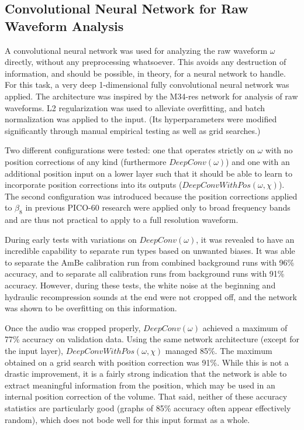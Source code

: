 \documentclass[10pt]{article}
\begin{document}
\subsection{Convolutional Neural Network for Raw Waveform Analysis}

A convolutional neural network was used for analyzing the raw waveform $\omega$ directly, without any preprocessing whatsoever. This avoids any destruction of information, and should be possible, in theory, for a neural network to handle. For this task, a very deep 1-dimensional fully convolutional neural network was applied. The architecture was inspired by the M34-res network \cite{verydeepconvnets} for analysis of raw waveforms. L2 regularization was used to alleviate overfitting, and batch normalization was applied to the input. (Its hyperparameters were modified significantly through manual empirical testing as well as grid searches.)

Two different configurations were tested: one that operates strictly on $\omega$ with no position corrections of any kind (furthermore $DeepConv(\omega)$) and one with an additional position input on a lower layer such that it should be able to learn to incorporate position corrections into its outputs ($DeepConvWithPos(\omega, \chi)$). The second configuration was introduced because the position corrections applied to $\beta_{8}$ in previous PICO-60 research were applied only to broad frequency bands and are thus not practical to apply to a full resolution waveform.

During early tests with variations on $DeepConv(\omega)$, it was revealed to have an incredible capability to separate run types based on unwanted biases. It was able to separate the AmBe calibration run from combined background runs with 96\% accuracy, and to separate all calibration runs from background runs with 91\% accuracy. However, during these tests, the white noise at the beginning and hydraulic recompression sounds at the end were not cropped off, and the network was shown to be overfitting on this information.

Once the audio was cropped properly, $DeepConv(\omega)$ achieved a maximum of 77\% accuracy on validation data. Using the same network architecture (except for the input layer), $DeepConvWithPos(\omega, \chi)$ managed 85\%. The maximum obtained on a grid search with position correction was 91\%. While this is not a drastic improvement, it is a fairly strong indication that the network is able to extract meaningful information from the position, which may be used in an internal position correction of the volume. That said, neither of these accuracy statistics are particularly good (graphs of 85\% accuracy often appear effectively random), which does not bode well for this input format as a whole.
\end{document}
